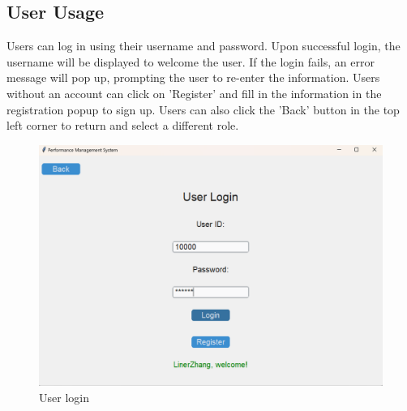 \documentclass[12pt]{article}
\begin{document}
\subsection{User Usage}
\par Users can log in using their username and password. Upon successful login, the username will be displayed to welcome the user. If the login fails, an error message will pop up, prompting the user to re-enter the information. Users without an account can click on 'Register' and fill in the information in the registration popup to sign up.
Users can also click the 'Back' button in the top left corner to return and select a different role.
\begin{figure}[H]
    \centering
    \begin{minipage}{0.58\textwidth}
        \centering
        \includegraphics[width=\textwidth]{4.png}
        \caption{User login}
        \label{Figure 4}
    \end{minipage}
    \hfill
    \begin{minipage}{0.35\textwidth}
        \centering

\end{minipage}
\end{figure}
\end{document}
